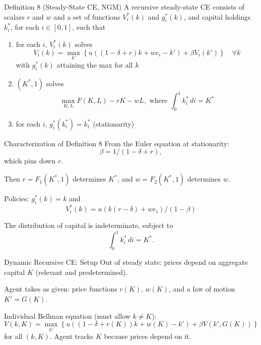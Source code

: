 \documentclass[blue]{beamer}
\begin{document}
\begin{frame}{Definition 8 (Steady-State CE, NGM)}
	A recursive steady-state CE consists of scalars $r$ and $w$ and a set of functions $V_i^*(k)$ and $g_i^*(k)$, and capital holdings $k_i^*$, for each $i \in [0,1]$, such that
	
	\begin{enumerate}
		\item for each $i$, $V_i^*(k)$ solves
		\[
		V_i(k) = \max_{k'} \left\{ u((1-\delta+r)k + we_i - k') + \beta V_i(k') \right\} \quad \forall k
		\]
		with $g_i^*(k)$ attaining the max for all $k$
		
		\item $(K^*, 1)$ solves 
		$$
		\max_{K,L} F(K,L) - rK - wL, \text{ where }\int_0^1 k_i^* \, di = K^*
		$$
		
		\item for each $i$, $g_i^*(k_i^*) = k_i^*$ \quad (stationarity)
	\end{enumerate}
\end{frame}

\begin{frame}{Characterization of Definition 8}
	From the Euler equation at stationarity: 
	$$
	\beta = 1/(1-\delta+r),
	$$
	which pins down $r$.
	
	\bigskip
	Then $r = F_1(K^*,1)$ determines $K^*$, and $w = F_2(K^*,1)$ determines $w$.
	
	\bigskip
	Policies: $g_i^*(k) = k$ and
	$$
	V_i^*(k) = u(k(r-\delta) + we_i)/(1-\beta)
	$$

	
	\bigskip
	The distribution of capital is indeterminate, subject to 
	$$
	\int_0^1 k_i^* \, di = K^*.
	$$
\end{frame}

\begin{frame}{Dynamic Recursive CE: Setup}
	Out of steady state: prices depend on aggregate capital $K$ (relevant and predetermined).
	
	\bigskip
	Agent takes as given: price functions $r(K)$, $w(K)$, and a law of motion $K' = G(K)$.
	
	\bigskip
	Individual Bellman equation (must allow $k \neq K$):
	\[
	V(k, K) = \max_{k'} \left\{ u((1-\delta+r(K))k + w(K) - k') + \beta V(k', G(K)) \right\}
	\]
	for all $(k, K)$. Agent tracks $K$ because prices depend on it.
\end{frame}
\end{document}
